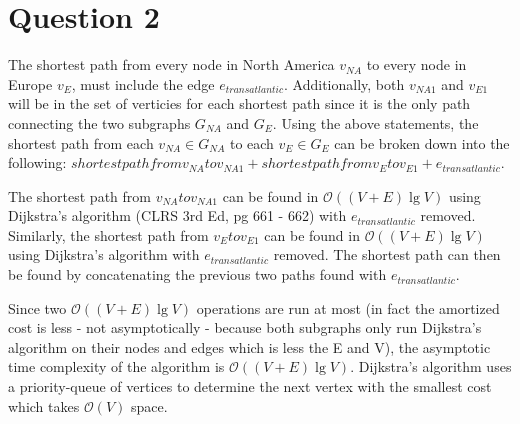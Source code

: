 \section{Question 2}
The shortest path from every node in North America $v_{NA}$ to every node in Europe $v_E$, must include the edge $e_{transatlantic}$.
Additionally, both $v_{NA1}$ and $v_{E1}$ will be in the set of verticies for each shortest path since it is the only path connecting the two subgraphs $G_{NA}$ and $G_{E}$.
\linebreak
Using the above statements, the shortest path from each $v_{NA} \in G_{NA}$ to each $v_E \in G_E$ can be broken down into the following:
$shortest path from v_{NA} to v_{NA1} + shortest path from v_E to v_{E1} + e_{transatlantic}$.
\linebreak

The shortest path from $v_{NA} to v_{NA1}$ can be found in $\mathcal{O}((V + E)\lg{V})$ using Dijkstra's algorithm (CLRS 3rd Ed, pg 661 - 662) with $e_{transatlantic}$ removed.
Similarly, the shortest path from $v_{E} to v_{E1}$ can be found in $\mathcal{O}((V + E)\lg{V})$ using Dijkstra's algorithm with $e_{transatlantic}$ removed.
The shortest path can then be found by concatenating the previous two paths found with $e_{transatlantic}$.

\linebreak
Since two $\mathcal{O}((V + E)\lg{V})$ operations are run at most (in fact the amortized cost is less - not asymptotically - because 
both subgraphs only run Dijkstra's algorithm on their nodes and edges which is less the E and V), the asymptotic time complexity of the algorithm is $\mathcal{O}((V + E)\lg{V})$.
Dijkstra's algorithm uses a priority-queue of vertices to determine the next vertex with the smallest cost which takes $\mathcal{O}(V)$ space.
